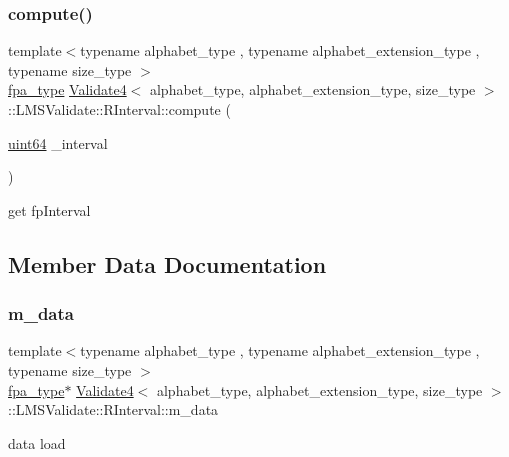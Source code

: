 \subsubsection{\texorpdfstring{compute()}{compute()}}
{\footnotesize\ttfamily template$<$typename alphabet\+\_\+type , typename alphabet\+\_\+extension\+\_\+type , typename size\+\_\+type $>$ \\
\hyperlink{common_8h_a7fdaf8b9b3d2f6ae6b10597a8d3f96ee}{fpa\+\_\+type} \hyperlink{class_validate4}{Validate4}$<$ alphabet\+\_\+type, alphabet\+\_\+extension\+\_\+type, size\+\_\+type $>$\+::L\+M\+S\+Validate\+::\+R\+Interval\+::compute (\begin{DoxyParamCaption}\item[{\hyperlink{types_8h_a60e8696a4678cd348e991a1f172e53f7}{uint64}}]{\+\_\+interval }\end{DoxyParamCaption})\hspace{0.3cm}{\ttfamily [inline]}}



get fp\+Interval 



\subsection{Member Data Documentation}
\mbox{\label{struct_validate4_1_1_l_m_s_validate_1_1_r_interval_ac666861e46f85b525452722ee93e6ff0}} 
\subsubsection{\texorpdfstring{m\+\_\+data}{m\_data}}
{\footnotesize\ttfamily template$<$typename alphabet\+\_\+type , typename alphabet\+\_\+extension\+\_\+type , typename size\+\_\+type $>$ \\
\hyperlink{common_8h_a7fdaf8b9b3d2f6ae6b10597a8d3f96ee}{fpa\+\_\+type}$\ast$ \hyperlink{class_validate4}{Validate4}$<$ alphabet\+\_\+type, alphabet\+\_\+extension\+\_\+type, size\+\_\+type $>$\+::L\+M\+S\+Validate\+::\+R\+Interval\+::m\+\_\+data}



data load 

\mbox{\label{struct_validate4_1_1_l_m_s_validate_1_1_r_interval_ac1b3892751cdcfaa18b45203a247ffc5}} 
